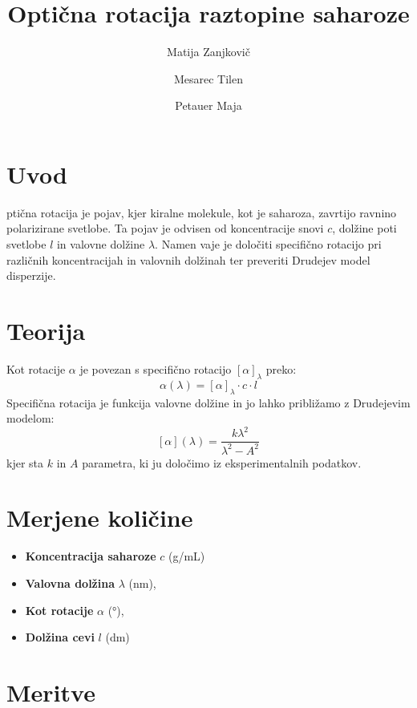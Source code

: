 \documentclass[9pt,a4paper,twocolumn,twoside]{tau-class/tau}
\title{Optična rotacija raztopine saharoze}
\author[a]{Matija Zanjkovič}
\affil[a]{Univerza v Mariboru, Fakulteta za naravoslovje in matematiko}
\author[a]{Mesarec Tilen}
\author[a]{Petauer Maja}
\begin{document}
\setlength{\parindent}{0pt}
        
    \maketitle 
    \thispagestyle{firststyle} 
    \tauabstract 

\section{Uvod}

ptična rotacija je pojav, kjer kiralne molekule, kot je saharoza, zavrtijo ravnino polarizirane svetlobe. Ta pojav je odvisen od koncentracije snovi $c$, dolžine poti svetlobe $l$ in valovne dolžine $\lambda$. Namen vaje je določiti specifično rotacijo pri različnih koncentracijah in valovnih dolžinah ter preveriti Drudejev model disperzije.

\section{Teorija}

Kot rotacije $\alpha$ je povezan s specifično rotacijo $[\alpha]_\lambda$ preko:
\[
\alpha(\lambda) = [\alpha]_\lambda \cdot c \cdot l
\]
Specifična rotacija je funkcija valovne dolžine in jo lahko približamo z Drudejevim modelom:
\[
[\alpha](\lambda) = \frac{k \lambda^2}{\lambda^2 - A^2}
\]
kjer sta $k$ in $A$ parametra, ki ju določimo iz eksperimentalnih podatkov.

\section{Merjene količine}

\begin{itemize}
    \item \textbf{Koncentracija saharoze} $c$ (g/mL)
    \item \textbf{Valovna dolžina} $\lambda$ (nm),
    \item \textbf{Kot rotacije} $\alpha$ (°), 
    \item \textbf{Dolžina cevi} $l$ (dm)
\end{itemize}


\section{Meritve}
\end{document}
